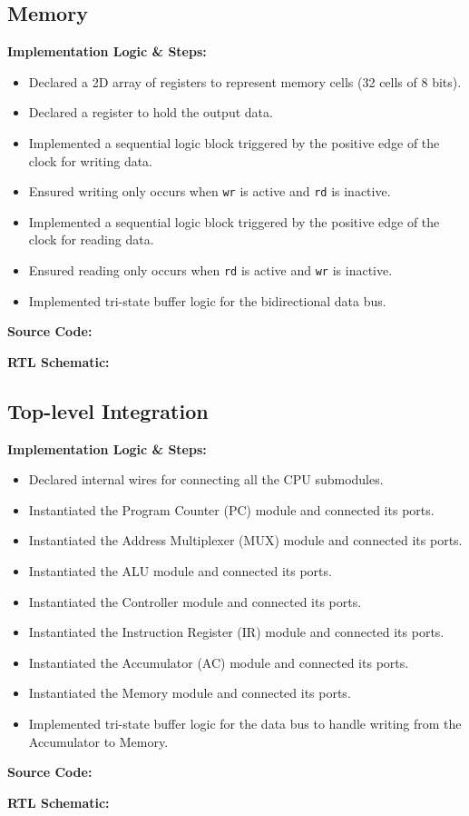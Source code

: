 \subsection{Memory}
\textbf{Implementation Logic \& Steps:}
\begin{itemize}
	\item Declared a 2D array of registers to represent memory cells (32 cells of 8 bits).
	\item Declared a register to hold the output data.
	\item Implemented a sequential logic block triggered by the positive edge of the clock for writing data.
	\item Ensured writing only occurs when \texttt{wr} is active and \texttt{rd} is inactive.
	\item Implemented a sequential logic block triggered by the positive edge of the clock for reading data.
	\item Ensured reading only occurs when \texttt{rd} is active and \texttt{wr} is inactive.
	\item Implemented tri-state buffer logic for the bidirectional data bus.
\end{itemize}

\textbf{Source Code:}

\textbf{RTL Schematic:}

\subsection{Top-level Integration}
\textbf{Implementation Logic \& Steps:}
\begin{itemize}
	\item Declared internal wires for connecting all the CPU submodules.
	\item Instantiated the Program Counter (PC) module and connected its ports.
	\item Instantiated the Address Multiplexer (MUX) module and connected its ports.
	\item Instantiated the ALU module and connected its ports.
	\item Instantiated the Controller module and connected its ports.
	\item Instantiated the Instruction Register (IR) module and connected its ports.
	\item Instantiated the Accumulator (AC) module and connected its ports.
	\item Instantiated the Memory module and connected its ports.
	\item Implemented tri-state buffer logic for the data bus to handle writing from the Accumulator to Memory.
\end{itemize}

\textbf{Source Code:}

\textbf{RTL Schematic:}
